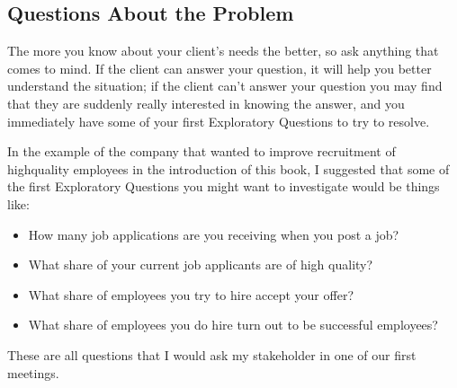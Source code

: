 \documentclass[letterpaper,10pt,english]{jupyterBook}
\begin{document}
\subsection{Questions About the Problem}
\label{\detokenize{20_problems_to_questions/20_stakeholder_management:questions-about-the-problem}}
\sphinxAtStartPar
The more you know about your client’s needs the better, so ask anything that comes to mind. If the client can answer your question, it will help you better understand the situation; if the client can’t answer your question you may find that they are suddenly really interested in knowing the answer, and you immediately have some of your first Exploratory Questions to try to resolve.

\sphinxAtStartPar
In the example of the company that wanted to improve recruitment of high\sphinxhyphen{}quality employees in the introduction of this book, I suggested that some of the first Exploratory Questions you might want to investigate would be things like:
\begin{itemize}
\item {} 
\sphinxAtStartPar
How many job applications are you receiving when you post a job?

\item {} 
\sphinxAtStartPar
What share of your current job applicants are of high quality?

\item {} 
\sphinxAtStartPar
What share of employees you try to hire accept your offer?

\item {} 
\sphinxAtStartPar
What share of employees you do hire turn out to be successful employees?

\end{itemize}

\sphinxAtStartPar
These are all questions that I would ask my stakeholder in one of our first meetings.
\end{document}
